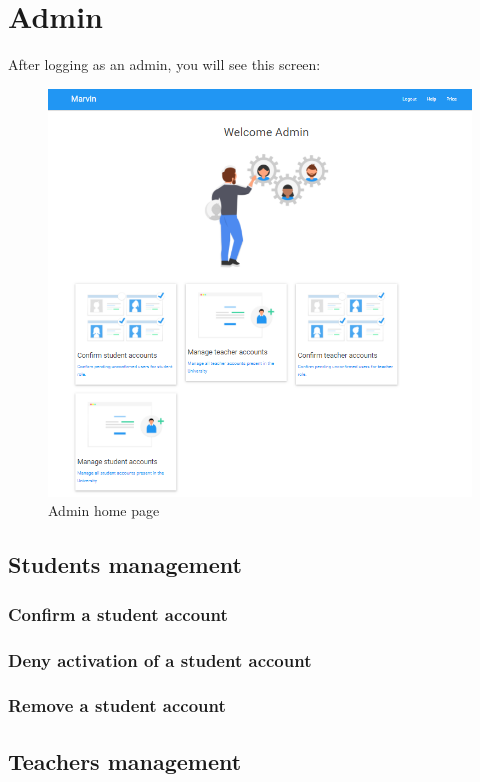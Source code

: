 \documentclass[ManualeUtente]{subfiles}
\begin{document}
\chapter{Admin}
After logging as an admin, you will see this screen:
\begin{figure}[H]
	\centering
	\includegraphics[width=1\linewidth]{image/Admin}
	\caption[Admin home page]{Admin home page}
	\label{fig:universityaddamin}
\end{figure}

\section{Students management}
\subsection{Confirm a student account}
\subsection{Deny activation of a student account}
\subsection{Remove a student account}

\section{Teachers management}
\end{document}

